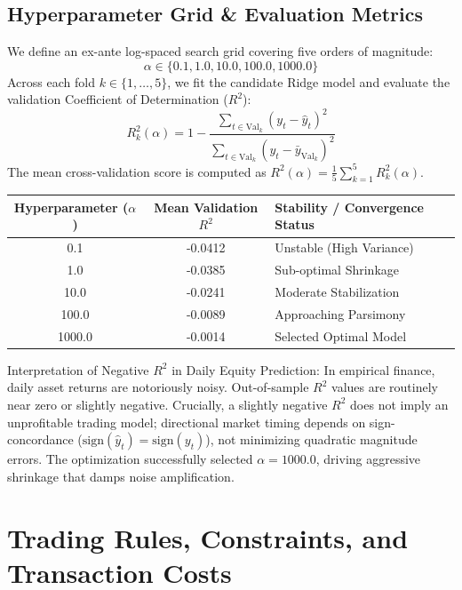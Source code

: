 \documentclass[12pt, a4paper]{article}
\begin{document}
\subsection{Hyperparameter Grid \& Evaluation Metrics}
We define an ex-ante log-spaced search grid covering five orders of magnitude:
\begin{equation}
\alpha \in \{0.1, 1.0, 10.0, 100.0, 1000.0\}
\end{equation}
Across each fold $k \in \{1, \dots, 5\}$, we fit the candidate Ridge model and evaluate the validation Coefficient 
of Determination ($R^2$):
\begin{equation}
R^2_k(\alpha) = 1 - \frac{\sum_{t \in \text{Val}_k} (y_t - \hat{y}_t)^2}{\sum_{t \in \text{Val}_k} (y_t - \bar{y}_{\text{Val}_k})^2}
\end{equation}
The mean cross-validation score is computed as $R^2(\alpha) = \frac{1}{5} \sum_{k=1}^5 R^2_k(\alpha)$.

\begin{table}[H]
\centering
\begin{tabular}{c c l}
\toprule
\textbf{Hyperparameter} ($\alpha$) & \textbf{Mean Validation} $R^2$ & \textbf{Stability / Convergence Status} \\
\midrule
0.1 & -0.0412 & Unstable (High Variance) \\
1.0 & -0.0385 & Sub-optimal Shrinkage \\
10.0 & -0.0241 & Moderate Stabilization \\
100.0 & -0.0089 & Approaching Parsimony \\
1000.0 & -0.0014 & Selected Optimal Model \\
\bottomrule
\end{tabular}
\end{table}

Interpretation of Negative $R^2$ in Daily Equity Prediction:  In empirical finance, daily asset returns 
are notoriously noisy. Out-of-sample $R^2$ values are routinely near zero or slightly negative. Crucially, a 
slightly negative $R^2$ does not imply an unprofitable trading model; directional market timing depends on 
sign-concordance ($\text{sign}(\hat{y}_t) = \text{sign}(y_t)$), not minimizing quadratic magnitude errors. The optimization 
successfully selected $\alpha = 1000.0$, driving aggressive shrinkage that damps noise amplification.

\section{Trading Rules, Constraints, and Transaction Costs}
\end{document}
